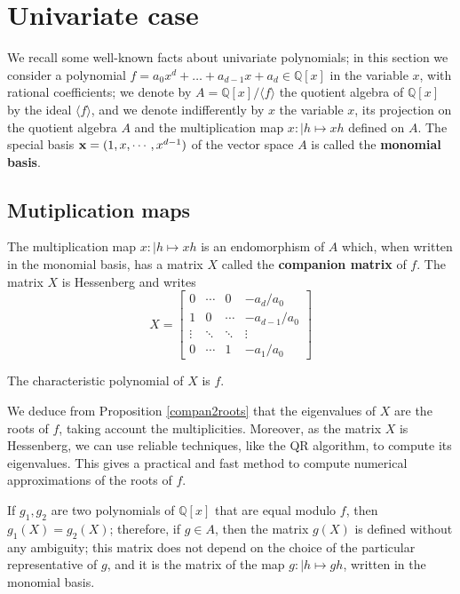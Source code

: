 \documentclass{standalone}
\begin{document}
\section{Univariate case}
\label{univariate}
We recall some well-known facts about univariate polynomials;
in this section we consider a polynomial $f = a_0x^d + \dots + a_{d-1}x + a_d \in \mathbb{Q}[x]$ in the variable $x$, with rational coefficients; we denote by $A = \mathbb{Q}[x]/\langle f \rangle$ the quotient algebra of $\mathbb{Q}[x]$ by the ideal $\langle f \rangle$, and we denote indifferently by $x$ the variable $x$, its projection on the quotient algebra $A$ and the multiplication map $x : \left\vert h \mapsto xh \right.$ defined on $A$. 
The special basis $\bold{x} = (1, x,\cdots, x^{d-1})$ of the vector space $A$ is called the {\bf monomial basis}.

\subsection{Mutiplication maps}
The multiplication map $x : \left\vert h \mapsto xh \right.$ is an endomorphism of $A$ which, when written in the monomial basis, has a matrix $X$ called the {\bf companion matrix} of $f$. 
The matrix $X$ is Hessenberg and writes
\begin{equation}
\label{compan}
X =
\begin{bmatrix}
	0 & \cdots & 0 & -a_d/a_0 \\
	1 & 0 & \cdots & -a_{d-1}/a_0 \\
	\vdots  & \ddots  & \ddots & \vdots  \\
	0 & \cdots & 1 & -a_1/a_0
\end{bmatrix}
\end{equation}
\begin{prop}
\label{compan2roots}
The characteristic polynomial of $X$ is $f$.
\end{prop}

\begin{rem}
We deduce from Proposition \ref{compan2roots} that the eigenvalues of $X$ are the roots of $f$, taking account the multiplicities. 
Moreover, as the matrix $X$ is Hessenberg, we can use reliable techniques, like the QR algorithm, to compute its eigenvalues. 
This gives a practical and fast method to compute numerical approximations of the roots of $f$. 
\end{rem}

\begin{rem}
\label{g_1=g_2}
If $g_1, g_2$ are two polynomials of $\mathbb{Q}[x]$ that are equal modulo $f$, then $g_1(X) = g_2(X)$;
therefore, if $g \in A$, then the matrix $g(X)$ is defined without any ambiguity;
this matrix does not depend on the choice of the particular representative of $g$, and it is the matrix of the map $g:\left\vert h \mapsto gh \right.$, written in the monomial basis.
\end{rem}
\end{document}

